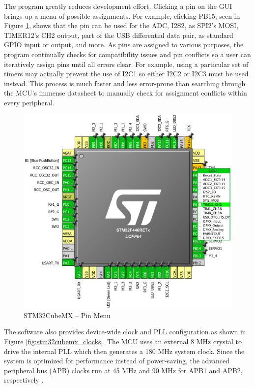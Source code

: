 The program greatly reduces development effort. Clicking a pin on the GUI brings up a menu of possible assignments. For example, clicking PB15, seen in Figure \ref{fig:stm32cubemx_pin}, shows that the pin can be used for the ADC, I2S2, as SPI2's MOSI, TIMER12's CH2 output, part of the USB differential data pair, as standard GPIO input or output, and more. As pins are assigned to various purposes, the program continually checks for compatibility issues and pin conflicts so a user can iteratively assign pins until all errors clear. For example, using a particular set of timers may actually prevent the use of I2C1 so either I2C2 or I2C3 must be used instead. This process is much faster and less error-prone than searching through the MCU's immense datasheet to manually check for assignment conflicts within every peripheral.
\begin{figure}[H]   %
	\centering \includegraphics[width=6in, keepaspectratio]{figures/stm32cubemx_pin.png}
	\caption{STM32CubeMX -- Pin Menu}\label{fig:stm32cubemx_pin}
\end{figure}
The software also provides device-wide clock and PLL configuration as shown in Figure \ref{fig:stm32cubemx_clocks}. The MCU uses an external 8 MHz crystal to drive the internal PLL which then generates a 180 MHz system clock. Since the system is optimized for performance instead of power-saving, the advanced peripheral bus (APB) clocks run at 45 MHz and 90 MHz for APB1 and APB2, respectively \cite{stm32f446re}. 

